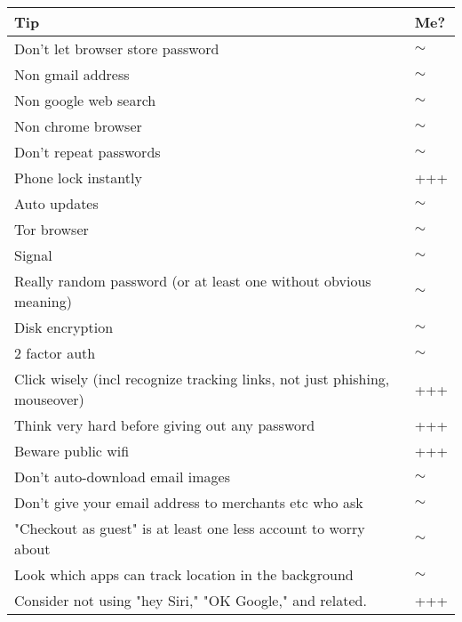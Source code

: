 \documentclass{tufte-handout}
\begin{document}
\begin{tabular}{p{5in}l}

\textbf{Tip} & \textbf{Me?} \\
\hline

Don't let browser store password & $\sim$ \\

Non gmail address & $\sim$ \\

Non google web search & $\sim$ \\

Non chrome browser & $\sim$ \\

Don't repeat passwords & $\sim$ \\

Phone lock instantly & +++ \\

Auto updates & $\sim$ \\

Tor browser & $\sim$ \\

Signal & $\sim$ \\

Really random password (or at least one without obvious meaning) & $\sim$ \\

Disk encryption & $\sim$ \\

2 factor auth & $\sim$ \\

Click wisely (incl recognize tracking links, not just phishing, mouseover) & +++ \\

Think very hard before giving out any password & +++ \\

Beware public wifi & +++ \\

Don't auto-download email images & $\sim$ \\

Don't give your email address to merchants etc who ask & $\sim$ \\

"Checkout as guest" is at least one less account to worry about & $\sim$ \\

Look which apps can track location in the background & $\sim$ \\

Consider not using "hey Siri," "OK Google," and related. & +++ \\


\end{tabular}
\end{document}
